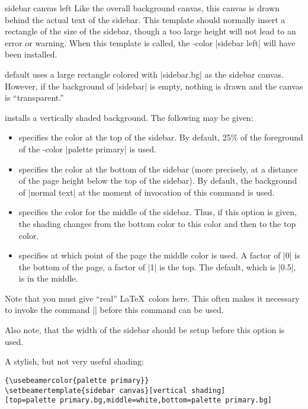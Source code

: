 \begin{element}{sidebar canvas left}\yes\no\no
  Like the overall background canvas, this canvas is drawn behind the
  actual text of the sidebar. This template should normally insert a
  rectangle of the size of the sidebar, though a too large height will
  not lead to an error or warning. When this template is called, the
  \beamer-color |sidebar left| will have been installed.

  \begin{templateoptions}
  \item{default}{}
    uses a large rectangle colored with |sidebar.bg| as the sidebar
    canvas. However, if the background of |sidebar| is empty, nothing
    is drawn and the canvas is ``transparent.''

    installs a vertically shaded background. The following
     may be given:
    \begin{itemize}
    \item {} specifies the color at the
      top of the sidebar. By default, 25\% of the foreground of the
      \beamer-color |palette primary| is used.
    \item {} specifies the color at the
      bottom of the sidebar (more precisely, at a distance of the page
      height below the top of the sidebar). By default, the background of
      |normal text| at the moment of invocation of this command is
      used.
    \item {} specifies the color
      for the middle of the sidebar. Thus, if this option is given, the
      shading changes from the bottom color to this color and then
      to the top color.
    \item {} specifies at which
      point of the page the middle color is used. A factor of |0| is
      the bottom of the page, a factor of |1| is the top. The
      default, which is |0.5|, is in the middle.
    \end{itemize}
    Note that you must give ``real'' \LaTeX\ colors here. This often
    makes it necessary to invoke the command |\usebeamercolor| before
    this command can be used.

    Also note, that the width of the sidebar should be setup before
    this option is used.

    \example A stylish, but not very useful shading:
\begin{verbatim}
{\usebeamercolor{palette primary}}
\setbeamertemplate{sidebar canvas}[vertical shading]
[top=palette primary.bg,middle=white,bottom=palette primary.bg]
\end{verbatim}


\end{templateoptions}
\end{element}
